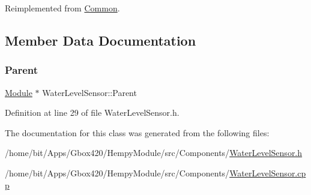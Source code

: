 Reimplemented from \hyperlink{class_common_a9e60e2c26a5f4d72342a59a969954636}{Common}.



\subsection{Member Data Documentation}
\mbox{\label{class_water_level_sensor_a5de4738d98dc4a28ecdf9614f5198dfc}} 
\subsubsection{\texorpdfstring{Parent}{Parent}}
{\footnotesize\ttfamily \hyperlink{class_module}{Module} $\ast$ Water\+Level\+Sensor\+::\+Parent\hspace{0.3cm}{\ttfamily [protected]}}



Definition at line 29 of file Water\+Level\+Sensor.\+h.



The documentation for this class was generated from the following files\+:\begin{DoxyCompactItemize}
\item 
/home/bit/\+Apps/\+Gbox420/\+Hempy\+Module/src/\+Components/\hyperlink{_hempy_module_2src_2_components_2_water_level_sensor_8h}{Water\+Level\+Sensor.\+h}\item 
/home/bit/\+Apps/\+Gbox420/\+Hempy\+Module/src/\+Components/\hyperlink{_hempy_module_2src_2_components_2_water_level_sensor_8cpp}{Water\+Level\+Sensor.\+cpp}\end{DoxyCompactItemize}
